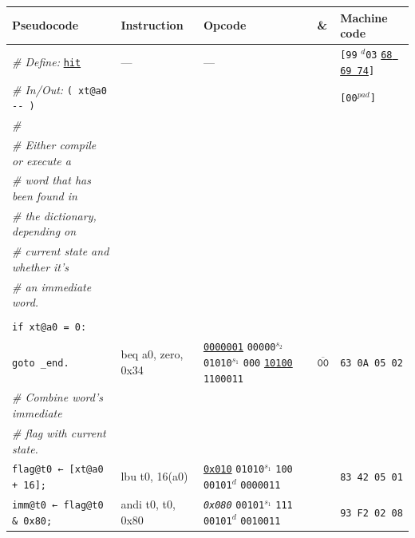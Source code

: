 \documentclass[a4paper,12pt,final]{article}
\begin{document}
\begin{table}[!htbp] \begin{adjustwidth}{-1cm}{-1cm} \fontsize{8}{9.600000}\selectfont
\begin{center}
\begin{tabular}{l|ll|l|l}
\textbf{Pseudocode} & \textbf{Instruction} & \textbf{Opcode} & \textbf{\&} & \textbf{Machine code}\\[0pt]
\hline
\emph{\# Define:} \uline{\texttt{hit}} & --- & --- &  & \texttt{[99} \(^{d}\)​\texttt{03} \uline{\texttt{68 69 74}}​\texttt{]}\\[0pt]
\emph{\# In/Out:} \texttt{( xt@a0 -{}-{} )} &  &  &  & \texttt{[00}​\(^{pad}\)​\texttt{]}\\[0pt]
\emph{\#} &  &  &  & \\[0pt]
\emph{\# Either compile or execute a} &  &  &  & \\[0pt]
\emph{\# word that has been found in} &  &  &  & \\[0pt]
\emph{\# the dictionary, depending on} &  &  &  & \\[0pt]
\emph{\# current state and whether it's} &  &  &  & \\[0pt]
\emph{\# an immediate word.} &  &  &  & \\[0pt]
 &  &  &  & \\[0pt]
\hspace{1.053000em} \texttt{if xt@a0 = 0:} &  &  &  & \\[0pt]
\hspace{2.106000em}   \texttt{goto \_end.} & beq a0, zero, 0x34 & \uline{\texttt{0000001}} \texttt{00000}​\(^{s_{2}}\) \texttt{01010}​\(^{s_{1}}\) \texttt{000} \uline{\texttt{10100}} \texttt{1100011} & \(\overline{\texttt{00}}\) & \texttt{63 0A 05 02}\\[0pt]
\hspace{1.053000em} \emph{\# Combine word's immediate} &  &  &  & \\[0pt]
\hspace{1.053000em} \emph{\# flag with current state.} &  &  &  & \\[0pt]
\hspace{1.053000em} \texttt{flag@t0 ← [xt@a0 + 16];} & lbu t0, 16(a0) & \uline{\texttt{0x010}}                    \texttt{01010}​\(^{s_{1}}\) \texttt{100} \texttt{00101}​\(^{d}\)  \texttt{0000011} &  & \texttt{83 42 05 01}\\[0pt]
\hspace{1.053000em} \texttt{imm@t0 ← flag@t0 \& 0x80;} & andi t0, t0, 0x80 & \emph{\texttt{0x080}}                    \texttt{00101}​\(^{s_{1}}\) \texttt{111} \texttt{00101}​\(^{d}\)  \texttt{0010011} &  & \texttt{93 F2 02 08}\\[0pt]

\end{tabular}
\end{center}
\end{adjustwidth}
\end{table}
\end{document}
